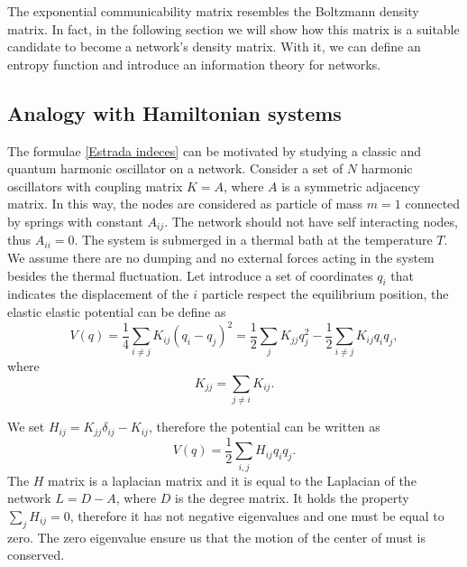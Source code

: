 The exponential communicability matrix resembles the Boltzmann density matrix. In fact, in the following section we will show how this matrix is a suitable candidate to become a network's density matrix. With it, we can define an entropy function and introduce an information theory for networks. 


\subsection{Analogy with Hamiltonian systems}
The formulae \eqref{Estrada indeces} can be motivated by studying a classic and quantum harmonic oscillator on a network.
Consider a set of $N$ harmonic oscillators with coupling matrix $K = A$, where $A$ is a symmetric adjacency matrix. In this way, the nodes are considered as particle of mass $m = 1$ connected by springs with constant $A_{ij}$. The network should not have self interacting nodes, thus $A_{ii} = 0$. The system is submerged in a thermal bath at the temperature $T$. We assume there are no dumping and no external forces acting in the system besides the thermal fluctuation. 
Let introduce a set of coordinates $q_i$ that indicates the displacement of the $i$ particle respect the equilibrium position, the elastic elastic potential can be define as
\begin{equation}
    V(q) = \frac{1}{4}\sum_{i\neq j} K_{ij}(q_i-q_j)^2 = \frac{1}{2}\sum_{j}K_{jj}q_j^2 - \frac{1}{2} \sum_{i\neq j}K_{ij}q_iq_j,
\end{equation}
where 
\begin{equation}
    K_{jj} = \sum_{j \neq i} K_{ij}.
\end{equation}

We set $H_{ij}= K_{jj}\delta_{ij} - K_{ij}$, therefore the potential can be written as
\begin{equation}
    V(q) = \frac{1}{2}\sum_{i,j} H_{ij} q_i q_j.
\end{equation}
The $H$ matrix is a laplacian matrix and it is equal to the Laplacian of the network $L = D - A$, where $D$ is the degree matrix. It holds the property $\sum_j H_{ij} = 0$, therefore it has not negative eigenvalues and one must be equal to zero.
The zero eigenvalue ensure us that the motion of the center of must is conserved. %

